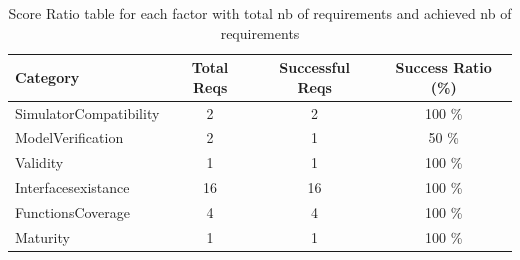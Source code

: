 \documentclass{article}
\begin{document}
						\begin{table}
						\centering
						\caption{Score Ratio table for each factor with total nb of requirements and achieved nb of requirements}
						\begin{tabular}{|l|c|c|c|}
						\hline
						Category & Total Reqs & Successful Reqs & Success Ratio (\%) \\
						\hline

							    SimulatorCompatibility & 2 & 2 & 100 \% \\
							 

							    ModelVerification & 2 & 1 & 50 \% \\
							 

							    Validity & 1 & 1 & 100 \% \\
							 

							    Interfacesexistance & 16 & 16 & 100 \% \\
							 

							    FunctionsCoverage & 4 & 4 & 100 \% \\
							 

							    Maturity & 1 & 1 & 100 \% \\
							 
					
						
						\hline
						\end{tabular}
						\end{table}




										
								

			
\end{document}
